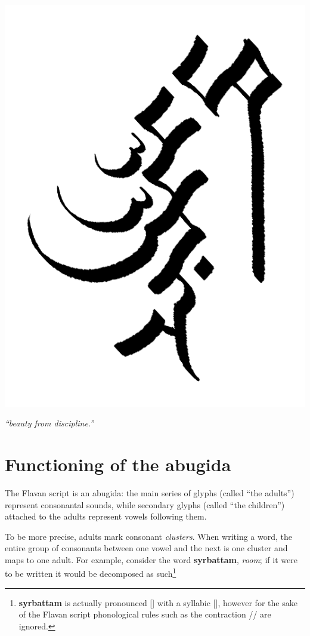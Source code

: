 \documentclass[10pt,oneside]{memoir}
\newcommand{\ipa}[1]{/\textipa{#1}/}
\newcommand{\apa}[1]{[\textipa{#1}]}
\begin{document}
\begin{center}
    \hspace{-60pt} \includegraphics[scale=2.1]{scriptchapter.png}

    \emph{``beauty from discipline.''}
\end{center}

\pagebreak

\section{Functioning of the abugida}

The Flavan script is an abugida: the main series of glyphs (called ``the adults'') represent consonantal sounds, while secondary glyphs (called ``the children'') attached to the adults represent vowels following them.

To be more precise, adults mark consonant \emph{clusters}. When writing a word, the entire group of consonants between one vowel and the next is one cluster and maps to one adult. For example, consider the word \textbf{syrbattam}, \emph{room}; if it were to be written it would be decomposed as such\footnote{\textbf{syrbattam} is actually pronounced \apa{s\s{r}"bat:am} with a syllabic \apa{r}, however for the sake of the Flavan script phonological rules such as the contraction \ipa{1r} \textrightarrow \apa{\s{r}} are ignored.}
\end{document}
